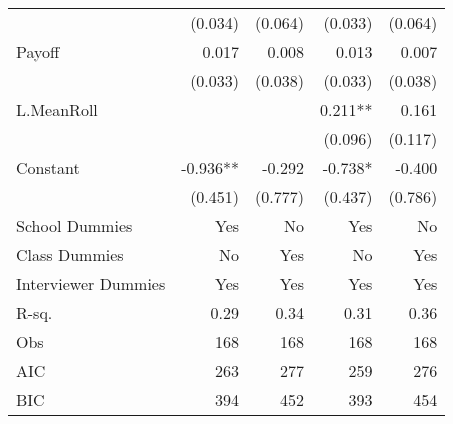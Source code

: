 \begin{table}[htbp]
\begin{tabular}{l*{4}{D{.}{.}{-1}}}
                    &             (0.034)   &             (0.064)   &             (0.033)   &             (0.064)   \\
Payoff              &               0.017   &               0.008   &               0.013   &               0.007   \\
                    &             (0.033)   &             (0.038)   &             (0.033)   &             (0.038)   \\
L.MeanRoll          &                       &                       &               0.211** &               0.161   \\
                    &                       &                       &             (0.096)   &             (0.117)   \\
Constant            &              -0.936** &              -0.292   &              -0.738*  &              -0.400   \\
                    &             (0.451)   &             (0.777)   &             (0.437)   &             (0.786)   \\
School Dummies      &                 Yes   &                  No   &                 Yes   &                  No   \\
Class Dummies       &                  No   &                 Yes   &                  No   &                 Yes   \\
Interviewer Dummies &                 Yes   &                 Yes   &                 Yes   &                 Yes   \\
\midrule
R-sq.               &                0.29   &                0.34   &                0.31   &                0.36   \\
Obs                 &                 168   &                 168   &                 168   &                 168   \\
AIC                 &                 263   &                 277   &                 259   &                 276   \\
BIC                 &                 394   &                 452   &                 393   &                 454   \\
\bottomrule
\end{tabular}
\end{table}
